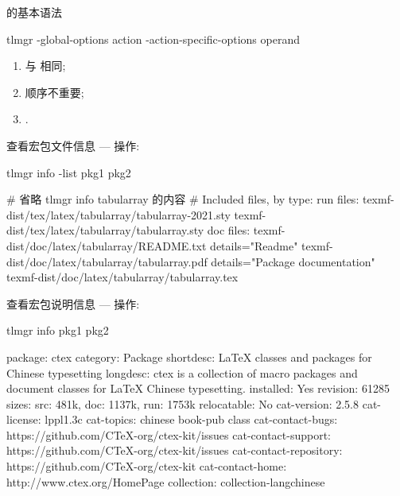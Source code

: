 \begin{frame}[fragile]{\tlmgr 的基本语法}
\begin{cmdcode}
tlmgr -global-options action -action-specific-options operand
\end{cmdcode}
\begin{enumerate}
  \item \cmd{-} 与 \cmd{--} 相同;
  \item 顺序不重要;
  \item {}.
\end{enumerate}
\end{frame}


\begin{frame}[fragile]{查看宏包文件信息 --- 操作: }

\begin{cmdcode}
tlmgr info -list pkg1 pkg2
\end{cmdcode}
\begin{outputcode}
# 省略 tlmgr info tabularray 的内容 #
Included files, by type:
run files:
texmf-dist/tex/latex/tabularray/tabularray-2021.sty
texmf-dist/tex/latex/tabularray/tabularray.sty
doc files:
texmf-dist/doc/latex/tabularray/README.txt details="Readme"
texmf-dist/doc/latex/tabularray/tabularray.pdf details="Package documentation"
texmf-dist/doc/latex/tabularray/tabularray.tex  
\end{outputcode}
\end{frame}


\begin{frame}[fragile]{查看宏包说明信息 --- 操作: }
\begin{cmdcode}
tlmgr info pkg1 pkg2
\end{cmdcode}
\begin{outputcode}
package:     ctex
category:    Package
shortdesc:   LaTeX classes and packages for Chinese typesetting
longdesc:    ctex is a collection of macro packages and document classes for LaTeX Chinese typesetting.
installed:   Yes
revision:    61285
sizes:       src: 481k, doc: 1137k, run: 1753k
relocatable: No
cat-version: 2.5.8
cat-license: lppl1.3c
cat-topics:  chinese book-pub class
cat-contact-bugs: https://github.com/CTeX-org/ctex-kit/issues
cat-contact-support: https://github.com/CTeX-org/ctex-kit/issues
cat-contact-repository: https://github.com/CTeX-org/ctex-kit
cat-contact-home: http://www.ctex.org/HomePage
collection:  collection-langchinese
\end{outputcode}
\end{frame}

